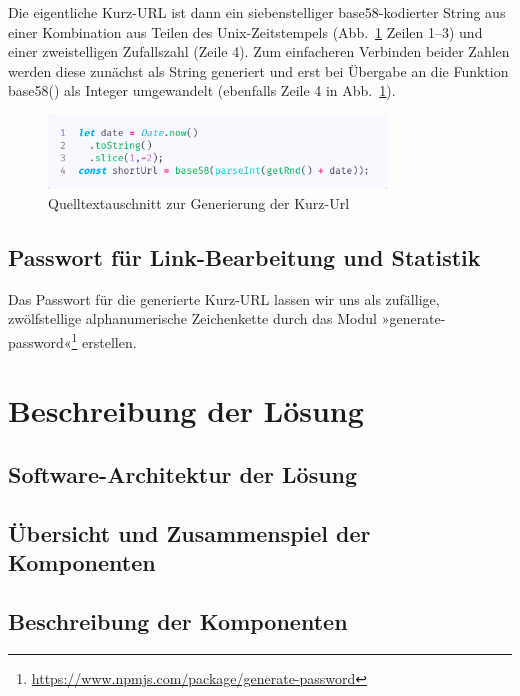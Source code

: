\documentclass[a4paper,11pt,DIV=12,overfullrule=on]{scrreprt}%
\begin{document}
Die eigentliche Kurz-\ac{URL} ist dann ein siebenstelliger base58-kodierter String aus einer Kombination aus Teilen des Unix-Zeitstempels (Abb.~\ref{fig:261shorturl} Zeilen 1–3) und einer zweistelligen Zufallszahl (Zeile 4). Zum einfacheren Verbinden beider Zahlen werden diese zunächst als String generiert und erst bei Übergabe an die Funktion {\ttfamily base58()} als Integer umgewandelt (ebenfalls Zeile 4 in Abb.~\ref{fig:261shorturl}).
\begin{figure}[h]%
    \begin{small}%
        \begin{center}%
            \includegraphics[width=0.8\textwidth]{2_6_1_shortUrl.png}%
        \end{center}%
        \caption{Quelltextauschnitt zur Generierung der Kurz-Url}%
        \label{fig:261shorturl}%
    \end{small}%
\end{figure}%


\section{Passwort für Link-Bearbeitung und Statistik}
Das Passwort für die generierte Kurz-\ac{URL} lassen wir uns als zufällige, zwölfstellige alphanumerische Zeichenkette durch das Modul »generate-password«\footnote{\href{https://www.npmjs.com/package/generate-password}{https://www.npmjs.com/package/generate-password}} erstellen.


\chapter{Beschreibung der Lösung}
\section{Software-Architektur der Lösung}
\section{Übersicht und Zusammenspiel der Komponenten}
\section{Beschreibung der Komponenten}
\end{document}
